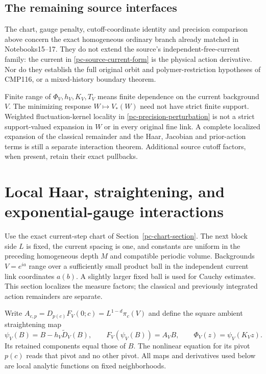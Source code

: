 \documentclass[11pt]{article}
\theoremstyle{remark}
\begin{document}
\subsection{The remaining source interfaces}
\label{pc-scope}

The chart, gauge penalty, cutoff-coordinate identity and
precision comparison above concern the exact homogeneous
ordinary branch already matched in Notebooks15--17. They
do not extend the source's independent-free-current family:
the current in \eqref{pc-source-current-form} is the physical
action derivative. Nor do they establish the full original
orbit and polymer-restriction hypotheses of CMP116, or a
mixed-history boundary theorem.

Finite range of $\Phi_V,h_V,K_V,T_V$ means finite dependence
on the current background $V$. The minimizing response
$W\mapsto V_*(W)$ need not have strict finite support.
Weighted fluctuation-kernel locality in
\eqref{pc-precision-perturbation} is not a strict
support-valued expansion in $W$ or in every original fine
link. A complete localized expansion of the classical
remainder and the Haar, Jacobian and prior-action terms is
still a separate interaction theorem. Additional source
cutoff factors, when present, retain their exact pullbacks.

\section{Local Haar, straightening, and exponential-gauge interactions}
\label{pm-section}

Use the exact current-step chart of Section~\ref{pc-chart-section}.
The next block side $L$ is fixed, the current spacing is one,
and constants are uniform in the preceding homogeneous depth $M$
and compatible periodic volume. Backgrounds $V=e^{ia}$ range
over a sufficiently small product ball in the independent
current link coordinates $a(b)$. A slightly larger fixed ball
is used for Cauchy estimates. This section localizes the measure
factors; the classical and previously integrated action
remainders are separate.

Write $A_{c,p}=D_{p(c)}F_V(0;c)=L^{1-d}\pi_c(V)$ and define
the square ambient straightening map
\begin{equation}\label{pm-ambient-map}
 \psi_V(B)=B-h_V\widetilde D_V(B),\qquad
 F_V(\psi_V(B))=A_VB,\qquad
 \Phi_V(z)=\psi_V(K_Vz).
\end{equation}
Its retained components equal those of $B$. The nonlinear
equation for its pivot $p(c)$ reads that pivot and no other
pivot. All maps and derivatives used below are local analytic
functions on fixed neighborhoods.
\end{document}
